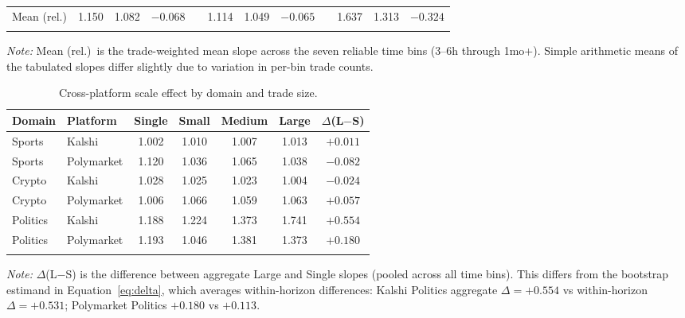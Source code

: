 \documentclass[numsec,webpdf,modern,medium]{oup-authoring-template}
\theoremstyle{thmstyleone}%
\theoremstyle{thmstyletwo}%
\theoremstyle{thmstylethree}%
\begin{document}
\begin{appendices}
\begin{table}[!t]
\begin{tabular*}{\textwidth}{@{\extracolsep{\fill}}lccclccclccc@{\extracolsep{\fill}}}
\midrule
Mean (rel.)     & 1.150 & 1.082 & $-0.068$ && 1.114 & 1.049 & $-0.065$ && 1.637 & 1.313 & $-0.324$ \\
\botrule
\end{tabular*}
\begin{tablenotes}%
\item \emph{Note:} Mean (rel.)\ is the trade-weighted mean slope across the seven reliable time bins (3--6h through 1mo+). Simple arithmetic means of the tabulated slopes differ slightly due to variation in per-bin trade counts.
\end{tablenotes}
\end{table}

\begin{table}[!t]
\caption{Cross-platform scale effect by domain and trade size.\label{tab:cross_scale}}%
\begin{tabular*}{\columnwidth}{@{\extracolsep\fill}llccccc@{\extracolsep\fill}}
\toprule
Domain & Platform & Single & Small & Medium & Large & $\Delta$(L$-$S) \\
\midrule
Sports   & Kalshi     & 1.002 & 1.010 & 1.007 & 1.013 & $+0.011$ \\
Sports   & Polymarket & 1.120 & 1.036 & 1.065 & 1.038 & $-0.082$ \\
Crypto   & Kalshi     & 1.028 & 1.025 & 1.023 & 1.004 & $-0.024$ \\
Crypto   & Polymarket & 1.006 & 1.066 & 1.059 & 1.063 & $+0.057$ \\
Politics & Kalshi     & 1.188 & 1.224 & 1.373 & 1.741 & $+0.554$ \\
Politics & Polymarket & 1.193 & 1.046 & 1.381 & 1.373 & $+0.180$ \\
\botrule
\end{tabular*}
\begin{tablenotes}%
\item \emph{Note:} $\Delta$(L$-$S) is the difference between aggregate Large and Single slopes (pooled across all time bins). This differs from the bootstrap estimand in Equation~\eqref{eq:delta}, which averages within-horizon differences: Kalshi Politics aggregate $\Delta = +0.554$ vs within-horizon $\Delta = +0.531$; Polymarket Politics $+0.180$ vs $+0.113$.
\end{tablenotes}
\end{table}


\end{appendices}
\end{document}
